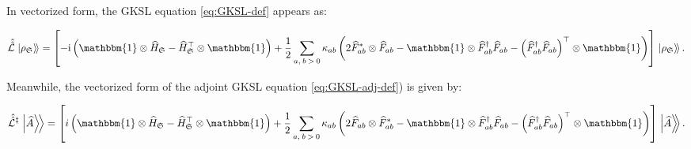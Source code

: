 \documentclass[preprints,article,accept,moreauthors,pdftex]{Definitions/mdpi}
\begin{document}
\begin{paracol}{2}
\begin{itemize}[labelindent=0mm,labelsep=1.25mm,leftmargin=*]
\end{itemize}

In vectorized form, the GKSL equation \eqref{eq:GKSL-def} appears as:
\end{paracol}
\begin{equation}
    \label{eq:vectorized-GKSL}
    \hat{\hat{\mathcal{L}}}\left.\ket{\rho_{\mathfrak{S}}}\!\right\rangle = \left[-\mathrm{i}\left(\mathbbm{1}\otimes\widehat{H}_{\mathfrak{S}}-\widehat{H}_{\mathfrak{S}}^{\top}\otimes\mathbbm{1}\right)+\frac{1}{2}\sum_{a,\:b\:>\:0}\kappa_{ab}\left(2\widehat{F}_{ab}^{\ast}\otimes\widehat{F}_{ab}-\mathbbm{1}\otimes\widehat{F}_{ab}^{\dagger}\widehat{F}_{ab}-\left(\widehat{F}_{ab}^{\dagger}\widehat{F}_{ab}\right)^{\top}\otimes\mathbbm{1}\right)\right]\left.\ket{\rho_{\mathfrak{S}}}\!\right\rangle.
\end{equation}
\begin{paracol}{2}
\switchcolumn
\noindent Meanwhile, the vectorized form of the adjoint GKSL equation \eqref{eq:GKSL-adj-def}) is given by:
\end{paracol}
\begin{equation}
    \label{eq:vectorized-adj-GKSL}
    \hat{\hat{\mathcal{L}}}^{\ddagger}\left.\ket{\widehat{A}}\!\right\rangle = \left[i\left(\mathbbm{1}\otimes\widehat{H}_{\mathfrak{S}}-\widehat{H}_{\mathfrak{S}}^{\top}\otimes\mathbbm{1}\right)+\frac{1}{2}\sum_{a,\:b\:>\:0}\kappa_{ab}\left(2\widehat{F}_{ab}\otimes\widehat{F}_{ab}^{\ast}-\mathbbm{1}\otimes\widehat{F}_{ab}^{\dagger}\widehat{F}_{ab}-\left(\widehat{F}_{ab}^{\dagger}\widehat{F}_{ab}\right)^{\top}\otimes\mathbbm{1}\right)\right] \left.\ket{\widehat{A}}\!\!\right\rangle.
\end{equation}
\end{document}
